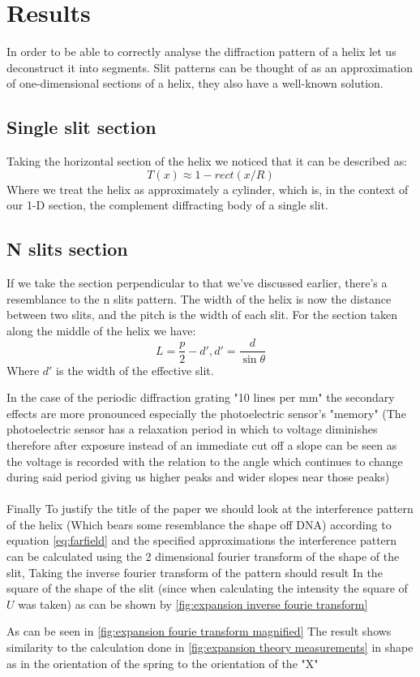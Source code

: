 \section{Results}\label{sec:results}
In order to be able to correctly analyse the diffraction pattern of a helix let us deconstruct it into segments.
Slit patterns can be thought of as an approximation of one-dimensional sections of a helix, they also have a well-known solution.

\subsection{Single slit section}
Taking the horizontal section of the helix we noticed that it can be described as:
\[T(x)\approx 1-rect(x/R)\]
Where we treat the helix as approximately a cylinder, which is, in the context of our 1-D section, the complement diffracting body of a single slit.


\subsection{N slits section}
If we take the section perpendicular to that we've discussed earlier, there's a resemblance to the n slits pattern.
The width of the helix is now the distance between two slits, and the pitch is the width of each slit.
For the section taken along the middle of the helix we have: \[L=\frac{p}{2}-d',d'=\frac{d}{\sin \theta}\]
Where $d'$ is the width of the effective slit.



In the case of the periodic diffraction grating "10 lines per mm" the secondary effects are more pronounced especially
the photoelectric sensor's "memory" (The photoelectric sensor has a relaxation period in which to voltage diminishes
therefore after exposure instead of an immediate cut off a slope can be seen as the voltage is recorded with the relation
to the angle which continues to change during said period giving us higher peaks and wider slopes near those peaks)\\
\\
Finally To justify the title of the paper we should look at the interference pattern of the helix (Which bears some resemblance the shape off DNA)
according to equation \eqref{eq:farfield} and the specified approximations the interference pattern can be calculated using
the 2 dimensional fourier transform of the shape of the slit, Taking the inverse fourier transform of the pattern should result
In the square of the shape of the slit (since when calculating the intensity the square of $U$ was taken)
as can be shown by \ref{fig:expansion inverse fourie transform}


As can be seen in \ref{fig:expansion fourie transform magnified} The result shows similarity to the calculation done in \ref{fig:expansion theory measurements}
in shape as in the orientation of the spring to the orientation of the "X"
